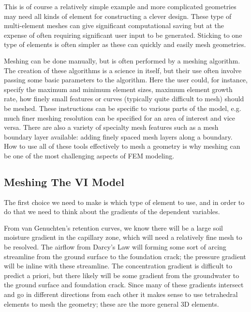 
This is of course a relatively simple example and more complicated geometries may need all kinds of element for constructing a clever design.
These type of multi-element meshes can give significant computational saving but at the expense of often requiring significant user input to be generated.
Sticking to one type of elements is often simpler as these can quickly and easily mesh geometries.\par

Meshing can be done manually, but is often performed by a meshing algorithm.
The creation of these algorithms is a science in itself, but their use often involve passing some basic parameters to the algorithm.
Here the user could, for instance, specify the maximum and minimum element sizes, maximum element growth rate, how finely small features or curves (typically quite difficult to mesh) should be meshed.
These instructions can be specific to various parts of the model, e.g. much finer meshing resolution can be specified for an area of interest and vice versa.
There are also a variety of specialty mesh features such as a mesh boundary layer available: adding finely spaced mesh layers along a boundary.
How to use all of these tools effectively to mesh a geometry is why meshing can be one of the most challenging aspects of FEM modeling.\par

\subsection{Meshing The VI Model}

The first choice we need to make is which type of element to use, and in order to do that we need to think about the gradients of the dependent variables.\par

From van Genuchten's retention curves, we know there will be a large soil moisture gradient in the capillary zone, which will need a relatively fine mesh to be resolved.
The airflow from Darcy's Law will forming some sort of arcing streamline from the ground surface to the foundation crack; the pressure gradient will be inline with these streamline.
The concentration gradient is difficult to predict a priori, but there likely will be some gradient from the groundwater to the ground surface and foundation crack.
Since many of these gradients intersect and go in different directions from each other it makes sense to use tetrahedral elements to mesh the geometry; these are the more general 3D elements.\par


